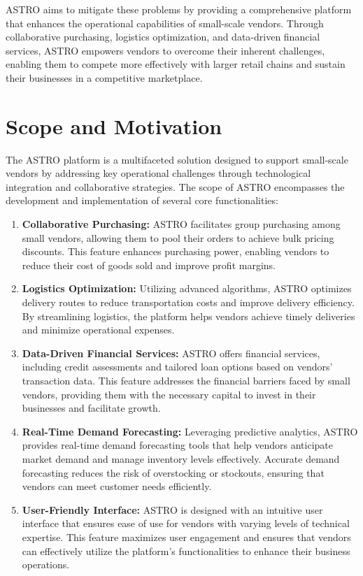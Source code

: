	ASTRO aims to mitigate these problems by providing a comprehensive platform that enhances the operational capabilities of small-scale vendors. Through collaborative purchasing, logistics optimization, and data-driven financial services, ASTRO empowers vendors to overcome their inherent challenges, enabling them to compete more effectively with larger retail chains and sustain their businesses in a competitive marketplace.	
	
	
	\section{Scope and Motivation}
	The ASTRO platform is a multifaceted solution designed to support small-scale vendors by addressing key operational challenges through technological integration and collaborative strategies. The scope of ASTRO encompasses the development and implementation of several core functionalities:

\begin{enumerate}
    \item \textbf{Collaborative Purchasing:} ASTRO facilitates group purchasing among small vendors, allowing them to pool their orders to achieve bulk pricing discounts. This feature enhances purchasing power, enabling vendors to reduce their cost of goods sold and improve profit margins.
    
    \item \textbf{Logistics Optimization:} Utilizing advanced algorithms, ASTRO optimizes delivery routes to reduce transportation costs and improve delivery efficiency. By streamlining logistics, the platform helps vendors achieve timely deliveries and minimize operational expenses.
    
    \item \textbf{Data-Driven Financial Services:} ASTRO offers financial services, including credit assessments and tailored loan options based on vendors’ transaction data. This feature addresses the financial barriers faced by small vendors, providing them with the necessary capital to invest in their businesses and facilitate growth.
    
    \item \textbf{Real-Time Demand Forecasting:} Leveraging predictive analytics, ASTRO provides real-time demand forecasting tools that help vendors anticipate market demand and manage inventory levels effectively. Accurate demand forecasting reduces the risk of overstocking or stockouts, ensuring that vendors can meet customer needs efficiently.
    
    \item \textbf{User-Friendly Interface:} ASTRO is designed with an intuitive user interface that ensures ease of use for vendors with varying levels of technical expertise. This feature maximizes user engagement and ensures that vendors can effectively utilize the platform’s functionalities to enhance their business operations.
\end{enumerate}

